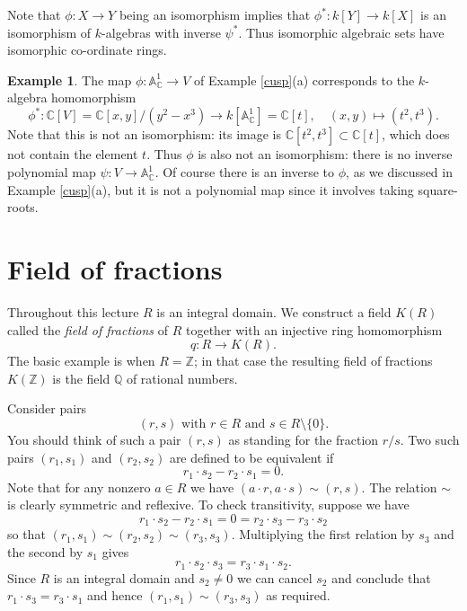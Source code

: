 \documentclass [12pt,oneside,a4paper,mathscr]{amsart}
\theoremstyle{definition}
\newtheorem{example}[thm]{Example}
\newcommand {\A}{\mathbb A}
\newcommand {\C}{\mathbb C}
\newcommand{\Q}{\mathbb{Q}}
\newcommand{\Z}{\mathbb Z}
\begin{document}
Note that $\phi\colon X \to Y$ being an isomorphism implies that $\phi^*\colon k[Y]\to k[X]$ is an isomorphism of $k$-algebras with inverse $\psi^*$. Thus isomorphic algebraic sets have isomorphic co-ordinate rings.

\begin{example}
The map $\phi\colon \A^1_\C \to V$ of Example \ref{cusp}(a) corresponds to the $k$-algebra homomorphism
\[\phi^*\colon \C[V]=\C[x,y]/(y^2-x^3) \to k[\A^1_\C]=\C[t], \quad (x,y)\mapsto (t^2,t^3).\]
Note that this is not an isomorphism: its image is $\C[t^2,t^3]\subset \C[t]$, which does not contain the element $t$.
Thus $\phi$ is also not an isomorphism: there is no inverse polynomial map $\psi\colon V \to \A^1_\C$. Of course there is an inverse to $\phi$, as we discussed in Example \ref{cusp}(a), but it is not a polynomial map since it involves taking square-roots.
\end{example}














\section{Field of fractions}

Throughout this lecture $R$ is an integral domain. We construct a field $K(R)$ called the \emph{field of fractions} of $R$ together with an injective ring homomorphism \[q\colon R\to K(R).\] The basic example is when $R=\Z$; in that case  the resulting field of fractions $K(\Z)$ is the field $\Q$ of rational numbers. 

Consider  pairs \[(r,s)\text{ with } r\in R\text{  and }s\in R\setminus \{0\}.\]
You should think of such a  pair $(r,s)$ as standing for the fraction $r/s$.
Two such pairs $(r_1,s_1)$ and $(r_2,s_2)$ are defined to be equivalent if
\[r_1 \cdot s_2 - r_2 \cdot s_1=0.\]
Note that for any nonzero $a\in R$ we have $(a \cdot r,a \cdot s)\sim (r,s)$.
The relation $\sim$ is clearly symmetric and reflexive. To check transitivity, suppose we have
\[r_1 \cdot s_2-r_2 \cdot s_1=0=r_2 \cdot s_3-r_3 \cdot s_2\]
so that $(r_1,s_1)\sim (r_2,s_2)\sim (r_3,s_3)$. Multiplying the first relation by $s_3$ and the second by $s_1$ gives
\[r_1 \cdot s_2 \cdot s_3=r_3 \cdot s_1 \cdot s_2.\]
Since $R$ is an integral domain and $s_2\neq 0$ we can cancel $s_2$ and conclude that $r_1 \cdot s_3=r_3 \cdot s_1$ and hence $(r_1,s_1)\sim (r_3,s_3)$ as required.
\end{document}
